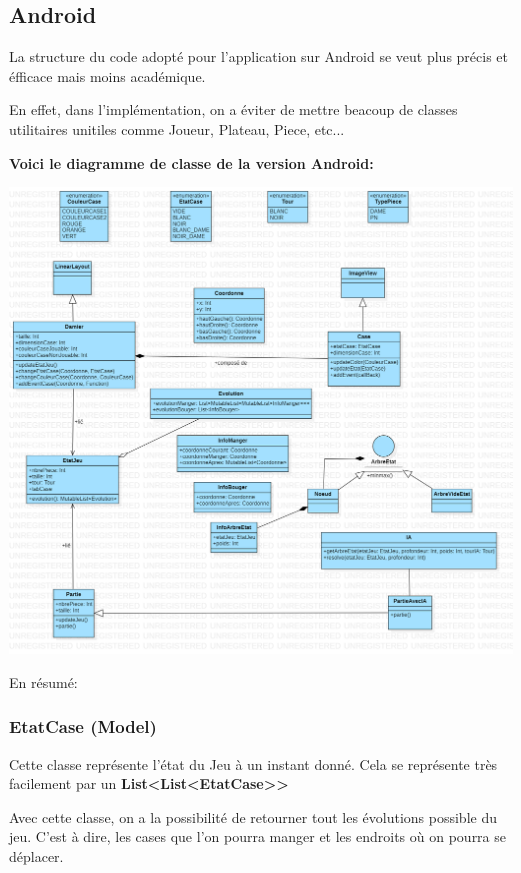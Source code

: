 \documentclass{article}
\begin{document}
\subsection{Android} %

La structure du code adopté pour l'application sur Android se veut plus précis et éfficace 
mais moins académique. 

En effet, dans l'implémentation, on a éviter de mettre beacoup de classes utilitaires unitiles
comme Joueur, Plateau, Piece, etc... 

\textbf{Voici le diagramme de classe de la version Android: }

\begin{center}
  \includegraphics[scale=0.26]{diagramme.png}
\end{center}

En résumé:

  \subsubsection{EtatCase (Model)}

  Cette classe représente l'état du Jeu à un instant donné. 
  Cela se représente très facilement par un \textbf{List<List<EtatCase>>}

  Avec cette classe, on a la possibilité de retourner tout les évolutions possible du jeu.
  C'est à dire, les cases que l'on pourra manger et les endroits où on pourra se déplacer.
\end{document}
